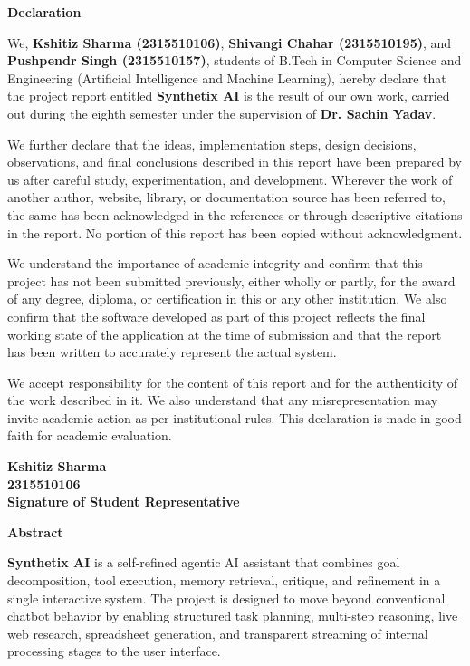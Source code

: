 \documentclass[11pt,oneside]{report}
\newcommand{\ProjectTitle}{Synthetix AI}
\newcommand{\GuideName}{Dr. Sachin Yadav}
\newcommand{\StudentName}{Kshitiz Sharma}
\newcommand{\RollNumber}{2315510106}
\newcommand{\TeamMemberOne}{Kshitiz Sharma (2315510106)}
\newcommand{\TeamMemberTwo}{Shivangi Chahar (2315510195)}
\newcommand{\TeamMemberThree}{Pushpendr Singh (2315510157)}
\begin{document}
\clearpage
\thispagestyle{empty}
\begin{center}
{\Large \textbf{Declaration}}\\[1.5cm]
\end{center}
\begin{minipage}{0.95\textwidth}
We, \textbf{\TeamMemberOne{}}, \textbf{\TeamMemberTwo{}}, and \textbf{\TeamMemberThree{}}, students of B.Tech in Computer Science and Engineering (Artificial Intelligence and Machine Learning), hereby declare that the project report entitled \textbf{\ProjectTitle{}} is the result of our own work, carried out during the eighth semester under the supervision of \textbf{\GuideName{}}.

We further declare that the ideas, implementation steps, design decisions, observations, and final conclusions described in this report have been prepared by us after careful study, experimentation, and development. Wherever the work of another author, website, library, or documentation source has been referred to, the same has been acknowledged in the references or through descriptive citations in the report. No portion of this report has been copied without acknowledgment.

We understand the importance of academic integrity and confirm that this project has not been submitted previously, either wholly or partly, for the award of any degree, diploma, or certification in this or any other institution. We also confirm that the software developed as part of this project reflects the final working state of the application at the time of submission and that the report has been written to accurately represent the actual system.

We accept responsibility for the content of this report and for the authenticity of the work described in it. We also understand that any misrepresentation may invite academic action as per institutional rules. This declaration is made in good faith for academic evaluation.
\end{minipage}

\vfill
\begin{flushright}
\textbf{\StudentName{}}\\
\textbf{\RollNumber{}}\\[0.8cm]
\textbf{Signature of Student Representative}
\end{flushright}

\clearpage
\thispagestyle{empty}
\begin{center}
{\Large \textbf{Abstract}}\\[1.5cm]
\end{center}
\noindent\textbf{\ProjectTitle{}} is a self-refined agentic AI assistant that combines goal decomposition, tool execution, memory retrieval, critique, and refinement in a single interactive system. The project is designed to move beyond conventional chatbot behavior by enabling structured task planning, multi-step reasoning, live web research, spreadsheet generation, and transparent streaming of internal processing stages to the user interface.
\end{document}
